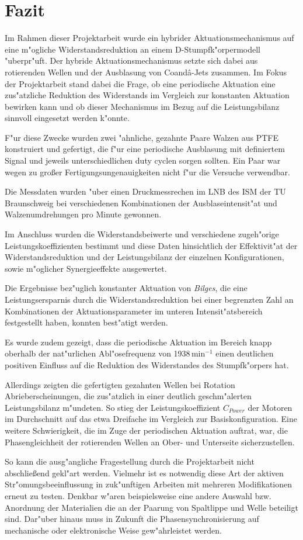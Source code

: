 \chapter{Fazit}\label{s:fazit}
Im Rahmen dieser Projektarbeit wurde ein hybrider Aktuationsmechanismus auf eine m"ogliche Widerstandsreduktion an einem D-Stumpfk"orpermodell "uberpr"uft.
Der hybride Aktuationsmechanismus setzte sich dabei aus rotierenden Wellen und der Ausblasung von Coand\^{a}-Jets zusammen.
Im Fokus der Projektarbeit stand dabei die Frage, ob eine periodische Aktuation eine zus"atzliche Reduktion des Widerstands im Vergleich zur konstanten Aktuation bewirken kann und ob dieser Mechanismus im Bezug auf die Leistungsbilanz sinnvoll eingesetzt werden k"onnte.

F"ur diese Zwecke wurden zwei "ahnliche, gezahnte Paare Walzen aus PTFE konstruiert und gefertigt, die f"ur eine periodische Ausblasung mit definiertem Signal und jeweils unterschiedlichen duty cyclen sorgen sollten. Ein Paar war wegen zu gro\ss{}er Fertigungsungenauigkeiten nicht f"ur die Versuche verwendbar.

Die Messdaten wurden "uber einen Druckmessrechen im LNB des ISM der TU Braunschweig bei verschiedenen Kombinationen der Ausblaseintensit"at und Walzenumdrehungen pro Minute gewonnen.

Im Anschluss wurden die Widerstandsbeiwerte  und verschiedene zugeh"orige Leistungskoeffizienten bestimmt und diese Daten hinsichtlich der Effektivit"at der Widerstandsreduktion und der Leistungsbilanz der einzelnen Konfigurationen, sowie m"oglicher Synergieeffekte ausgewertet.

Die Ergebnisse bez"uglich konstanter Aktuation von \textit{Bilges}, die eine Leistungsersparnis durch die Widerstandsreduktion bei einer begrenzten Zahl an Kombinationen der Aktuationsparameter im unteren Intensit"atsbereich festgestellt haben, konnten best"atigt werden. 

Es wurde zudem gezeigt, dass die periodische Aktuation im Bereich knapp oberhalb der nat"urlichen Abl"osefrequenz von 1938\,$\mathrm{min^{-1}}$ einen deutlichen positiven Einfluss auf die Reduktion des Widerstandes des Stumpfk"orpers hat.

Allerdings zeigten die gefertigten gezahnten Wellen bei Rotation Abrieberscheinungen, die zus"atzlich in einer deutlich geschm"alerten  Leistungsbilanz m"undeten.
So stieg der Leistungskoeffizient $C_{Power}$ der Motoren  im Durchschnitt auf das etwa Dreifache im Vergleich zur Basiskonfiguration.
Eine weitere Schwierigkeit, die im Zuge der periodischen Aktuation auftrat, war, die Phasengleichheit der rotierenden Wellen an Ober- und Unterseite sicherzustellen.

So kann die ausg"angliche Fragestellung durch die Projektarbeit nicht abschlie\ss{}end gekl"art werden. Vielmehr ist es notwendig diese Art der aktiven Str"omungsbeeinflussung in zuk"unftigen Arbeiten mit mehreren Modifikationen erneut zu testen. Denkbar w"aren beispielsweise eine andere Auswahl bzw. Anordnung der  Materialien die an der Paarung von Spaltlippe und Welle beteiligt sind. Dar"uber hinaus muss in Zukunft die Phasensynchronisierung auf mechanische oder elektronische Weise gew"ahrleistet werden.